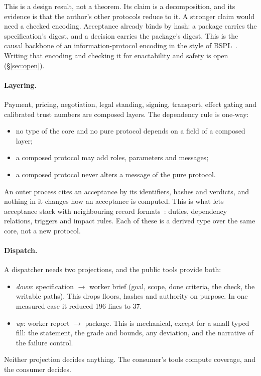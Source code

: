 \documentclass[11pt]{article}
\theoremstyle{definition}
\theoremstyle{remark}
\begin{document}
This is a design result, not a theorem. Its claim is a decomposition, and its evidence is that the
author's other protocols reduce to it. A stronger claim would need a checked encoding. Acceptance
already binds by hash: a package carries the specification's digest, and a decision carries the
package's digest. This is the causal backbone of an information-protocol encoding in the style of
BSPL~\cite{singh2011bspl}. Writing that encoding and checking it for enactability and safety is
open (§\ref{sec:open}).

\paragraph{Layering.} Payment, pricing, negotiation, legal standing, signing, transport, effect
gating and calibrated trust numbers are composed layers. The dependency rule is one-way:
\begin{itemize}[itemsep=1pt]
\item no type of the core and no pure protocol depends on a field of a composed layer;
\item a composed protocol may add roles, parameters and messages;
\item a composed protocol never alters a message of the pure protocol.
\end{itemize}
An outer process cites an acceptance by its identifiers, hashes and verdicts, and nothing in it
changes how an acceptance is computed. This is what lets acceptance stack with neighbouring
record formats~\cite{acceptedwork}: duties, dependency relations, triggers and impact rules. Each
of these is a derived type over the same core, not a new protocol.

\paragraph{Dispatch.} A dispatcher needs two projections, and the public tools provide both:
\begin{itemize}[itemsep=1pt]
\item \emph{down}: specification $\to$ worker brief (goal, scope, done criteria, the check, the
  writable paths). This drops floors, hashes and authority on purpose. In one measured case it
  reduced 196 lines to 37.
\item \emph{up}: worker report $\to$ package. This is mechanical, except for a small typed fill:
  the statement, the grade and bounds, any deviation, and the narrative of the failure control.
\end{itemize}
Neither projection decides anything. The consumer's tools compute coverage, and the consumer
decides.
\end{document}
